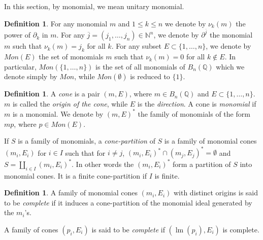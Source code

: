 \documentclass[10pt]{easychair}
\theoremstyle{definition}
\newtheorem{definition}[theorem]{Definition}
\newtheorem{example}[theorem]{Example}
\DeclareMathOperator{\lm}{lm}
\newcommand\Q{\mathbb{Q}}
\newcommand\Weyl[1]{B_{#1}(\Q)}
\begin{document}
In this section, by monomial, we mean unitary monomial.




\begin{definition}
  For any monomial $m$ and $1 \leq k \leq n$ we denote by $\nu_k(m)$
  the power of $\partial_k$ in $m$.
  For any $\overline j =(j_1,\ldots,j_n) \in \mathbb N^n$, we denote by $\partial^{\overline j}$
  the monomial $m$ such that $\nu_k(m) = j_k$ for all $k$. For any subset
  $E \subset \{1,\ldots,n\}$, we denote by $Mon(E)$ the set of monomials $m$ such that
  $\nu_k(m) = 0$ for all $k \notin E$. In particular, $Mon(\{1,\ldots,n\})$ is the set of
  all monomials of $\Weyl n$ which we denote simply by $Mon$, while $Mon(\emptyset)$ is
  reduced to $\{1\}$. 
\end{definition}

\begin{definition}
  A \emph{cone} is a pair $(m,E)$, where $m \in \Weyl n$ and $E \subset \{1,\ldots,n\}$.
  $m$ is called the \emph{origin of the cone}, while $E$
  is the \emph{direction}. A cone is \emph{monomial} if $m$ is a monomial.
  We denote by $(m,E)^*$ the family of monomials of the form $mp$,
  where $p \in Mon(E)$.

  If $S$ is a family of monomials, a \emph{cone-partition} of $S$ is a family
  of monomial cones $(m_i,E_i)$ for $i \in I$ such that for $i \neq j$,
  $(m_i,E_i)^* \cap (m_j,E_j)^* = \emptyset$ and $S = \coprod_{i \in I} (m_i,E_i)^*$.
  In other words the $(m_i,E_i)^*$ form a partition of $S$ into monomial cones.
  It is a finite cone-partition if $I$ is finite.
\end{definition}


 \begin{definition}
   A family of monomial cones $(m_i,E_i)$ with distinct origins is said
   to be \emph{complete} if it induces a cone-partition of the monomial ideal
   generated by the $m_i$'s. 

   A family of cones $(p_i,E_i)$ is said to be \emph{complete}
   if $(\lm(p_i),E_i)$ is complete. 
 \end{definition}
\end{document}
